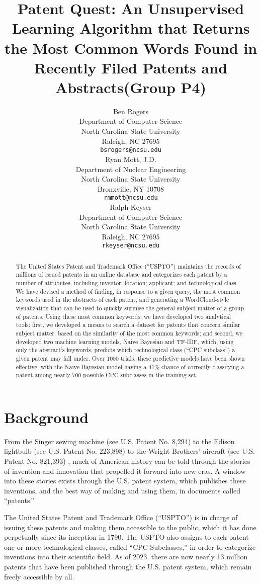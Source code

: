 \documentclass{article}
\title{Patent Quest: An Unsupervised Learning Algorithm that Returns the Most Common Words Found in Recently Filed Patents and Abstracts\newline (Group P4)}
\author{%
  Ben Rogers\\
  \small{Department of Computer Science}\\
  \small{North Carolina State University}\\
  \small{Raleigh, NC 27695} \\
  \texttt{bsrogers@ncsu.edu} \\
  \And
  Ryan Mott, J.D.\\
  \small{Department of Nuclear Engineering} \\
  \small{North Carolina State University} \\
  \small{Bronxville, NY 10708} \\
  \texttt{rmmott@ncsu.edu} \\
  \And
  Ralph Keyser \\
  \small{Department of Computer Science} \\
  \small{North Carolina State University} \\
  \small{Raleigh, NC 27695} \\
  \texttt{rkeyser@ncsu.edu} \\
}
\begin{document}
\maketitle

\begin{abstract}				
The United States Patent and Trademark Office (“USPTO”) maintains the records of millions of issued patents in an online database and categorizes each patent by a number of attributes, including inventor; location; applicant; and technological class.  We have devised a method of finding, in response to a given query, the most common keywords used in the abstracts of each patent, and generating a WordCloud-style visualization that can be used to quickly surmise the general subject matter of a group of patents. Using these most common keywords, we have developed two analytical tools: first, we developed a means to search a dataset for patents that concern similar subject matter, based on the similarity of the most common keywords; and second, we developed two machine learning models, Naive Bayesian and TF-IDF, which, using only the abstract’s keywords, predicts which technological class (“CPC subclass”) a given patent may fall under.  Over 1000 trials, these predictive models have been shown effective, with the Naive Bayesian model having a 41\% chance of correctly classifying a patent among nearly 700 possible CPC subclasses in the training set.
\end{abstract}


\section{Background}
From the Singer sewing machine (see U.S. Patent No. 8,294) to the Edison lightbulb (see U.S. Patent No. 223,898) to the Wright Brothers’ aircraft (see U.S. Patent No. 821,393) , much of American history can be told through the stories of invention and innovation that propelled it forward into new eras. A window into these stories exists through the U.S. patent system, which publishes these inventions, and the best way of making and using them, in documents called “patents.”

The United States Patent and Trademark Office (“USPTO”) is in charge of issuing these patents and making them accessible to the public, which it has done perpetually since its inception in 1790\cite{website:usptoms}. The USPTO also assigns to each patent one or more technological classes, called “CPC Subclasses,” in order to categorize inventions into their scientific field. As of 2023, there are now nearly 13 million patents that have been published through the U.S. patent system, which remain freely accessible by all\cite{website:usptoacc}.
\end{document}
